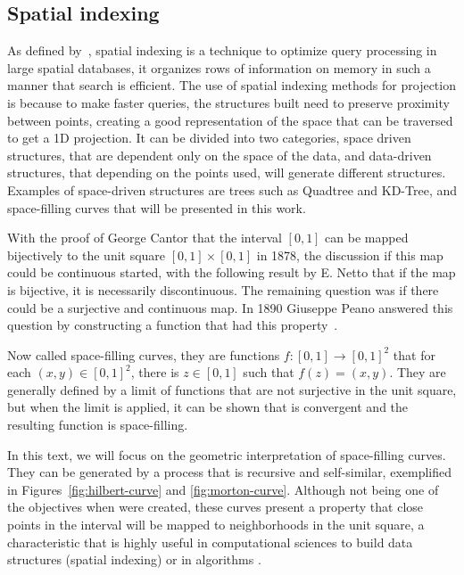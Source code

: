 \subsection{Spatial indexing}

As defined by~\cite{azri2013review}, spatial indexing is a technique to optimize query processing in large spatial databases,
%
it organizes rows of information on memory in such a manner that search is efficient.
%
The use of spatial indexing methods for projection is because to make faster queries,
%
the structures built need to preserve proximity between points, 
%
creating a good representation of the space that can be traversed to get a 1D projection.
%
It can be divided into two categories, space driven structures, that are dependent only on the space of the data, 
%
and data-driven structures, that depending on the points used, will generate different structures.
%
Examples of space-driven structures are trees such as Quadtree and KD-Tree, and space-filling curves that will be presented in this work.
%

With the proof of George Cantor that the interval $[0, 1]$ can be mapped bijectively to the unit square $[0, 1] \times [0, 1]$ in 1878, 
%
the discussion if this map could be continuous started, with the following result by E. Netto that if the map is bijective, it is necessarily discontinuous. The remaining question was if there could be a surjective and continuous map.
%
In 1890 Giuseppe Peano answered this question by constructing a function that had this property~\cite{sagan2012space}.

%
Now called space-filling curves, they are functions $f : [0, 1] \to [0, 1]^2$ that for each $(x, y) \in [0, 1]^2$, there is $z \in [0, 1]$ such that $f(z) = (x, y)$.
%
They are generally defined by a limit of functions that are not surjective in the unit square, but when the limit is applied, it can be shown that is convergent and the resulting function is space-filling.

%
In this text, we will focus on the geometric interpretation of space-filling curves. They can be generated by a process that is recursive and self-similar, exemplified in Figures~\ref{fig:hilbert-curve} and \ref{fig:morton-curve}.
%
Although not being one of the objectives when were created, these curves present a property that close points in the interval will be mapped to neighborhoods in the unit square, a characteristic that is highly useful in computational sciences to build data structures (spatial indexing) or in algorithms \cite{bader2012space}.

